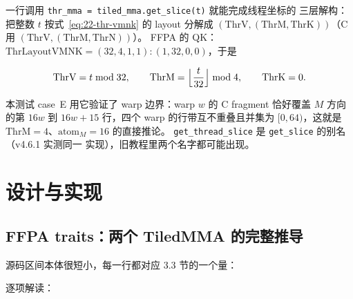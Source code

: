 一行调用 \texttt{thr\_\allowbreak{}mma =\allowbreak{} tiled\_\allowbreak{}mma.\allowbreak{}get\_\allowbreak{}slice\allowbreak{}(t)} 就能完成线程坐标的
三层解构：把整数 $t$ 按式~\eqref{eq:22-thr-vmnk} 的 layout 分解成
$(\mathrm{ThrV},(\mathrm{ThrM},\mathrm{ThrK}))$（C 用 $(\mathrm{ThrV},(\mathrm{ThrM},\mathrm{ThrN}))$）。
FFPA 的 QK：$\mathrm{ThrLayoutVMNK} = (32,4,1,1){:}(1,32,0,0)$，于是

\begin{equation}
  \mathrm{ThrV} = t \bmod 32,\qquad \mathrm{ThrM} = \Bigl\lfloor\frac{t}{32}
  \Bigr\rfloor \bmod 4 , \qquad \mathrm{ThrK} = 0 .
  \label{eq:22-get-slice}
\end{equation}

本测试 case~E 用它验证了 warp 边界：warp $w$ 的 C fragment 恰好覆盖
$M$ 方向的第 $16w$ 到 $16w+15$ 行，四个 warp 的行带互不重叠且并集为
$[0,64)$，这就是 $\mathrm{ThrM}=4$、$\mathrm{atom}_M=16$ 的直接推论。
\texttt{get\_\allowbreak{}thread\_\allowbreak{}slice} 是 \texttt{get\_slice} 的别名（v4.6.1 实测同一
实现），旧教程里两个名字都可能出现。

\section{设计与实现}

\subsection{FFPA traits：两个 TiledMMA 的完整推导}

源码区间本体很短小，每一行都对应 3.3 节的一个量：



逐项解读：

